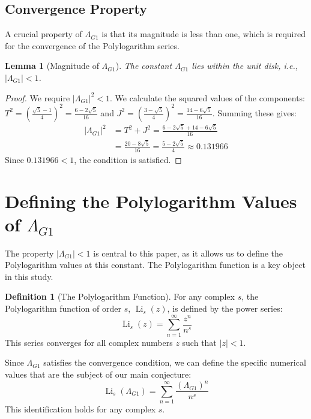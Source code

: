 \documentclass{amsart}
\theoremstyle{plain}
\newtheorem{lemma}[theorem]{Lemma}
\theoremstyle{definition}
\newtheorem{definition}[theorem]{Definition}
\theoremstyle{remark}
\DeclareMathOperator{\Li}{Li} %
\newcommand{\LambdaG}{\Lambda_{G1}}
\begin{document}
\subsection{Convergence Property}
A crucial property of $\LambdaG$ is that its magnitude is less than one, which is required for the convergence of the Polylogarithm series.

\begin{lemma}[Magnitude of $\LambdaG$]
\label{lem:convergence}
The constant $\LambdaG$ lies within the unit disk, i.e., $|\LambdaG| < 1$.
\end{lemma}
\begin{proof}
We require $|\LambdaG|^2 < 1$. We calculate the squared values of the components: $T^2 = \left(\frac{\sqrt{5}-1}{4}\right)^2 = \frac{6-2\sqrt{5}}{16}$ and $J^2 = \left(\frac{3-\sqrt{5}}{4}\right)^2 = \frac{14-6\sqrt{5}}{16}$.
Summing these gives:
\begin{align*}
    |\LambdaG|^2 &= T^2+J^2 = \frac{6-2\sqrt{5} + 14-6\sqrt{5}}{16} \\
                 &= \frac{20-8\sqrt{5}}{16} = \frac{5-2\sqrt{5}}{4} \approx 0.131966
\end{align*}
Since $0.131966 < 1$, the condition is satisfied. \qedhere
\end{proof}

\section{Defining the Polylogarithm Values of \texorpdfstring{$\LambdaG$}{Lambda\_G1}}
The property $|\LambdaG| < 1$ is central to this paper, as it allows us to define the Polylogarithm values at this constant. The Polylogarithm function is a key object in this study.

\begin{definition}[The Polylogarithm Function]
For any complex $s$, the Polylogarithm function of order $s$, $\Li_s(z)$, is defined by the power series:
$$ \Li_s(z) = \sum_{n=1}^{\infty} \frac{z^n}{n^s} $$
This series converges for all complex numbers $z$ such that $|z|<1$.
\end{definition}

Since $\LambdaG$ satisfies the convergence condition, we can define the specific numerical values that are the subject of our main conjecture:
$$ \Li_s(\LambdaG) = \sum_{n=1}^{\infty} \frac{(\LambdaG)^{n}}{n^s} $$
This identification holds for any complex $s$.
\end{document}
